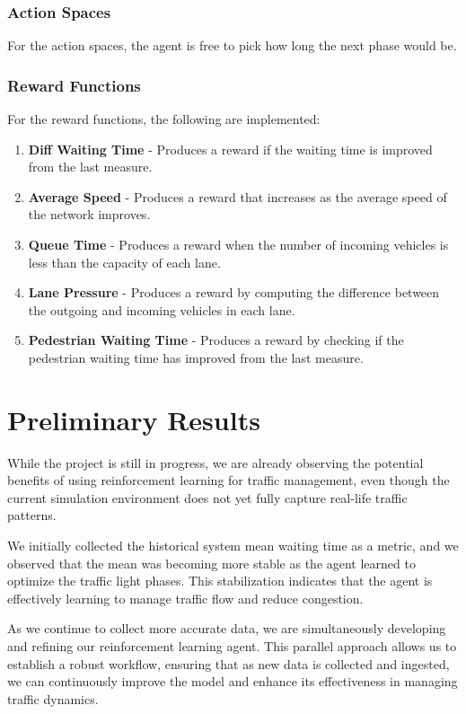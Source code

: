 \subsubsection{Action Spaces}
For the action spaces, the agent is free to pick how long the next phase would be.

\subsubsection{Reward Functions}
For the reward functions, the following are implemented:
\begin{enumerate}
    \item \textbf{Diff Waiting Time} - Produces a reward if the waiting time is improved from the last measure.
    \item \textbf{Average Speed} - Produces a reward that increases as the average speed of the network improves.
    \item \textbf{Queue Time} - Produces a reward when the number of incoming vehicles is less than the capacity of each lane.
    \item \textbf{Lane Pressure} - Produces a reward by computing the difference between the outgoing and incoming vehicles in each lane.
    \item \textbf{Pedestrian Waiting Time} - Produces a reward by checking if the pedestrian waiting time has improved from the last measure.
\end{enumerate}

\section{Preliminary Results}
While the project is still in progress, we are already observing the potential benefits of using reinforcement learning for traffic management, even though the current simulation environment does not yet fully capture real-life traffic patterns. 

We initially collected the historical system mean waiting time as a metric, and we observed that the mean was becoming more stable as the agent learned to optimize the traffic light phases. This stabilization indicates that the agent is effectively learning to manage traffic flow and reduce congestion.

As we continue to collect more accurate data, we are simultaneously developing and refining our reinforcement learning agent. This parallel approach allows us to establish a robust workflow, ensuring that as new data is collected and ingested, we can continuously improve the model and enhance its effectiveness in managing traffic dynamics.

